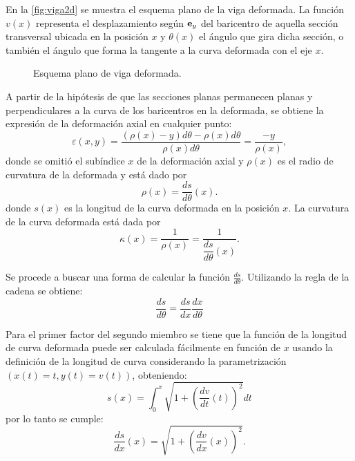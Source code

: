 En la \autoref{fig:viga2d} se muestra el esquema plano de la viga deformada. %
%
La función $v(x)$ representa el desplazamiento según ${\bf e}_y$ del baricentro de aquella sección transversal ubicada en la posición $x$ y $\theta(x)$ el ángulo que gira dicha sección, o también el ángulo que forma la tangente a la curva deformada con el eje $x$. %

\begin{figure}[htb]
	\centering
	\def\svgwidth{0.65\textwidth}
	
	\caption{Esquema plano de viga deformada.}
	\label{fig:viga2d}
\end{figure}
%
%

A partir de la hipótesis de que las secciones planas permanecen planas y perpendiculares a la curva de los baricentros en la deformada, se obtiene la expresión de la deformación axial en cualquier punto:
%
\begin{equation}
\varepsilon(x,y) = \frac{ (\rho(x) -y) d\theta - \rho(x) d \theta }{ \rho(x) d \theta} = \frac{-y}{\rho(x)},
\end{equation}
donde se omitió el subíndice $x$ de la deformación axial y $\rho(x)$ es el radio de curvatura de la deformada y está dado por
%
\begin{equation}
\rho(x) = \frac{ds}{d\theta}(x).
\end{equation}
%
donde $s(x)$ es la longitud de la curva deformada en la posición $x$.
%
La curvatura de la curva deformada está dada por
\begin{equation}
\kappa (x) = \frac{1}{\rho(x)} = \frac{1}{\dfrac{ds}{d \theta} (x)}.
\end{equation}

Se procede a buscar una forma de calcular la función $\frac{ds}{d\theta}$. %
Utilizando la regla de la cadena se obtiene:
%
\begin{equation}\label{eqn:dsdtheta}
\dfrac{ds}{d \theta} = \frac{ds}{dx} \frac{dx}{d\theta}
\end{equation}


Para el primer factor del segundo miembro se tiene que la función de la longitud de curva deformada puede ser calculada fácilmente en función de $x$ usando la definición de la longitud de curva considerando la parametrización $(x(t)=t,y(t)=v(t))$, obteniendo:
%
\begin{equation}
s(x) = \int_0^x \sqrt{1+  \left( \frac{d v}{d t}(t)\right)^2} dt
\end{equation}
%
por lo tanto se cumple:
\begin{equation}\label{eqn:dsdx}
\frac{ds}{dx} (x) = \sqrt{1+ \left( \frac{ d v}{d x}(x)  \right) ^2}.
\end{equation}

